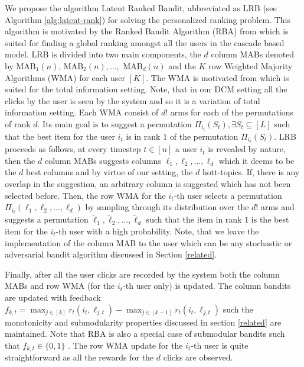 We propose the algorithm Latent Ranked Bandit, abbreviated as LRB (see Algorithm \ref{alg:latent-rank}) for solving the personalized ranking problem. This algorithm is motivated by the Ranked Bandit Algorithm (RBA) from \citet{radlinski2008learning} which is suited for finding a global ranking amongst all the users in the cascade based model. LRB is divided into two main components, the $d$ column MABs denoted by MAB$_1(n)$, MAB$_2(n), \dots,$ MAB$_d(n)$ and the $K$ row Weighted Majority Algorithms (WMA) for each user $[K]$. The WMA is motivated from \citet{littlestone1994weighted} which is suited for the total information setting. Note, that in our DCM setting all the clicks by the user is seen by the system and so it is a variation of total information setting. Each WMA consist of $d!$ arms for each of the permutations of rank $d$. Its main goal is to suggest a permutation $\Pi_{i_t}(S_t), \exists S_t \subseteq [L]$ such that the best item for the user $i_t$ is in rank $1$ of the permutation $\Pi_{i_t}(S_t)$.  LRB proceeds as follows, at every timestep $t\in[n]$ a user $i_t$ is revealed by nature, then the $d$ column MABs suggests columns ${\ell}_{1}, {\ell}_{2},\dots, {\ell}_{d}$ which it deems to be the $d$ best columns and by virtue of our setting, the $d$ hott-topics. If, there is any overlap in the suggestion, an arbitrary column is suggested which has not been selected before. Then, the row WMA for the $i_t$-th user selects a permutation $\Pi_{i_t}({\ell}_{1}, {\ell}_{2},\dots, {\ell}_{d})$ by sampling through its distribution over the $d!$ arms and suggests a permutation $\tilde{\ell}_{1}, \tilde{\ell}_{2},\dots, \tilde{\ell}_{d}$ such that the item in rank $1$ is the best item for the $i_t$-th user with a high probability. Note, that we leave the implementation of the column MAB to the user which can be any stochastic or adversarial bandit algorithm discussed in Section \ref{related}.

Finally, after all the user clicks are recorded by the system both the column MABs and row WMA (for the $i_t$-th user only) is updated. The column bandits are updated with feedback $f_{k,t} = \max_{j\in [k]} r_t(i_t, \ell_{j,t}) - \max_{j\in [k-1]} r_t(i_t,\ell_{j,t})$ such the monotonicity and submodularity properties discussed in section \ref{related} are maintained. Note that RBA is also a special case of submodular bandits such that $f_{k,t}\in\lbrace 0, 1\rbrace$ \citep{streeter2009online}. The row WMA update for the $i_t$-th user is quite straightforward as all the rewards for the $d$ clicks are observed. 


